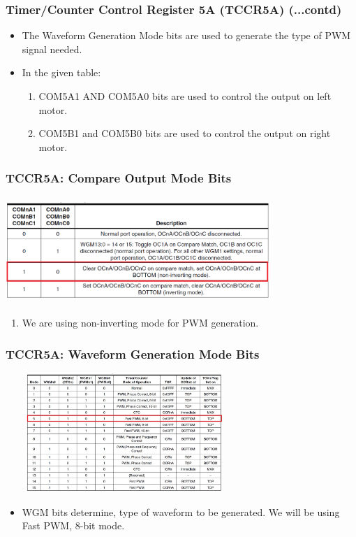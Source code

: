 \documentclass[table,10pt,red]{beamer}	%
\begin{document}
\begin{frame}
	\frametitle{Timer/Counter Control Register 5A (TCCR5A) (...contd)}
	\begin{itemize}
		\item <+-|alert@+> The Waveform Generation Mode bits are used to generate the type of PWM signal needed.
		\item <+-|alert@+> In the given table:
		\begin{enumerate} [$\checkmark$]
			\item <+-|alert@+> COM5A1 AND COM5A0 bits are used to control the output on left motor. 
			\item <+-|alert@+> COM5B1 and COM5B0 bits are used to control the output on right motor.
		\end{enumerate}
	\end{itemize}
	
\end{frame}	
\begin{frame}
\frametitle{TCCR5A: Compare Output Mode Bits}
\begin{center}
	\includegraphics[height=4cm, width=10cm]{com_bits}
\end{center}
	\begin{enumerate}
		\item <+-|alert@+> We are using non-inverting mode for PWM generation.
	\end{enumerate}
\end{frame}		
\begin{frame}
	\frametitle{TCCR5A: Waveform Generation Mode Bits}
	\centering
	\includegraphics[height=4.5cm, width=9cm]{wg_bits}
	\begin{itemize}
		\item <+-|alert@+> WGM bits determine, type of waveform to be generated. We will be using Fast PWM, 8-bit mode.
	\end{itemize}
\end{frame}
\end{document}
